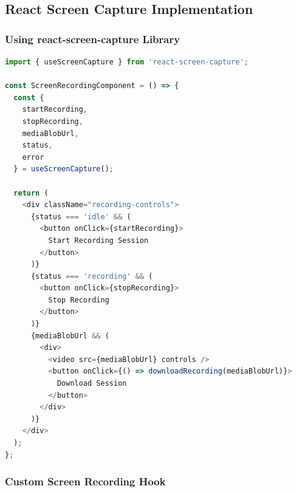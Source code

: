 \documentclass[12pt, a4paper]{article}
\begin{document}
\subsection{React Screen Capture Implementation}

\subsubsection{Using react-screen-capture Library}

\begin{lstlisting}[language=JavaScript, caption=Screen Capture Setup]
import { useScreenCapture } from 'react-screen-capture';

const ScreenRecordingComponent = () => {
  const {
    startRecording,
    stopRecording,
    mediaBlobUrl,
    status,
    error
  } = useScreenCapture();
  
  return (
    <div className="recording-controls">
      {status === 'idle' && (
        <button onClick={startRecording}>
          Start Recording Session
        </button>
      )}
      {status === 'recording' && (
        <button onClick={stopRecording}>
          Stop Recording
        </button>
      )}
      {mediaBlobUrl && (
        <div>
          <video src={mediaBlobUrl} controls />
          <button onClick={() => downloadRecording(mediaBlobUrl)}>
            Download Session
          </button>
        </div>
      )}
    </div>
  );
};
\end{lstlisting}

\subsubsection{Custom Screen Recording Hook}
\end{document}
